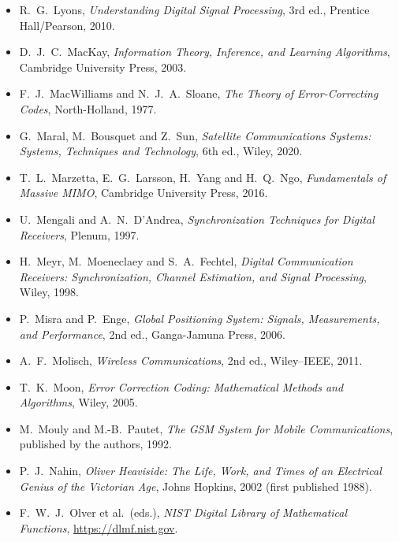 \begin{itemize}[leftmargin=1.5em,itemindent=-1.5em,itemsep=1.5pt plus 1pt,parsep=0pt,topsep=4pt,label={}]
\item R.~G.~Lyons, \emph{Understanding Digital Signal Processing}, 3rd ed., Prentice Hall/Pearson, 2010.
\item D.~J.~C.~MacKay, \emph{Information Theory, Inference, and Learning Algorithms}, Cambridge University Press, 2003.
\item F.~J.~MacWilliams and N.~J.~A.~Sloane, \emph{The Theory of Error-Correcting Codes}, North-Holland, 1977.
\item G.~Maral, M.~Bousquet and Z.~Sun, \emph{Satellite Communications Systems: Systems, Techniques and Technology}, 6th ed., Wiley, 2020.
\item T.~L.~Marzetta, E.~G.~Larsson, H.~Yang and H.~Q.~Ngo, \emph{Fundamentals of Massive MIMO}, Cambridge University Press, 2016.
\item U.~Mengali and A.~N.~D'Andrea, \emph{Synchronization Techniques for Digital Receivers}, Plenum, 1997.
\item H.~Meyr, M.~Moeneclaey and S.~A.~Fechtel, \emph{Digital Communication Receivers: Synchronization, Channel Estimation, and Signal Processing}, Wiley, 1998.
\item P.~Misra and P.~Enge, \emph{Global Positioning System: Signals, Measurements, and Performance}, 2nd ed., Ganga-Jamuna Press, 2006.
\item A.~F.~Molisch, \emph{Wireless Communications}, 2nd ed., Wiley--IEEE, 2011.
\item T.~K.~Moon, \emph{Error Correction Coding: Mathematical Methods and Algorithms}, Wiley, 2005.
\item M.~Mouly and M.-B.~Pautet, \emph{The GSM System for Mobile Communications}, published by the authors, 1992.
\item P.~J.~Nahin, \emph{Oliver Heaviside: The Life, Work, and Times of an Electrical Genius of the Victorian Age}, Johns Hopkins, 2002 (first published 1988).
\item F.~W.~J.~Olver et al.\ (eds.), \emph{NIST Digital Library of Mathematical Functions}, \url{https://dlmf.nist.gov}.

\end{itemize}
